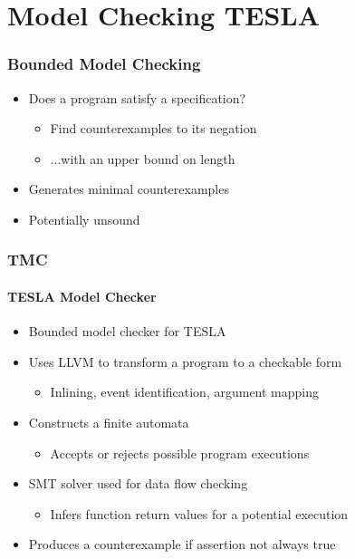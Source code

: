 \documentclass{beamer}
\begin{document}
\section{Model Checking TESLA}

\begin{frame}
  \frametitle{Bounded Model Checking}

  \begin{itemize}
    \item Does a program satisfy a specification?
      \begin{itemize}
        \item Find counterexamples to its negation
        \item ...with an upper bound on length
      \end{itemize}
    \item Generates minimal counterexamples
    \item Potentially unsound
  \end{itemize}
\end{frame}

\begin{frame}
  \frametitle{TMC}
  \framesubtitle{\textbf{T}ESLA \textbf{M}odel \textbf{C}hecker}

  \begin{itemize}
    \item Bounded model checker for TESLA
    \item Uses LLVM to transform a program to a checkable form
      \begin{itemize}
        \item Inlining, event identification, argument mapping
      \end{itemize}
    \item Constructs a finite automata
      \begin{itemize}
        \item Accepts or rejects possible program executions
      \end{itemize}
    \item SMT solver used for data flow checking
      \begin{itemize}
        \item Infers function return values for a potential execution
      \end{itemize}
    \item Produces a counterexample if assertion not always true
  \end{itemize}
\end{frame}
\end{document}
